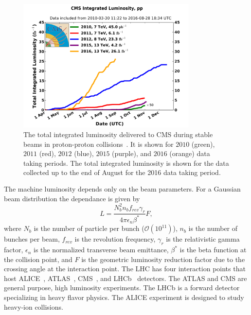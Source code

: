 \begin{figure}[h]
\centering
\includegraphics[width=0.8\textwidth]{figures_chapter2/int_lumi_cumulative_pp_2}
\caption{The total integrated luminosity delivered to CMS during stable beams in proton-proton collisions~\cite{lumi_plot}. It is shown for $2010$ (green), $2011$ (red), $2012$ (blue), $2015$ (purple), and $2016$ (orange) data taking periods. The total integrated luminosity is shown for the data collected up to the end of August for the 2016 data taking period.} 
\label{fig:int}
\end{figure}

The machine luminosity depends only on the beam parameters. For a Gaussian beam distribution the dependance is given by
\begin{equation} \label{eq:lumi_beam}
L = \frac{N_{b}^2n_bf_{rev}\gamma_{r}}{4\pi\epsilon_n\beta^{*}}F,
\end{equation}
where $N_b$ is the number of particle per bunch ($\mathcal{O}(10^{11})$), $n_b$ is the number of bunches per beam, $f_{rev}$ is the revolution frequency, $\gamma_r$ is the relativistic gamma factor, $\epsilon_n$ is the normalized transverse beam emittance, $\beta^{*}$ is the beta function at the collision point, and $F$ is the geometric luminosity reduction factor due to the crossing angle at the interaction point.  The LHC has four interaction points that host ALICE~\cite{Aamodt:2008zz}, ATLAS~\cite{Aad:2008zzm}, CMS~\cite{Chatrchyan:2008aa}, and LHCb~\cite{Alves:2008zz} detectors. The ATLAS and CMS are general purpose, high luminosity experiments. The LHCb is a forward detector specializing in heavy flavor physics. The ALICE experiment is designed to study heavy-ion collisions.   


